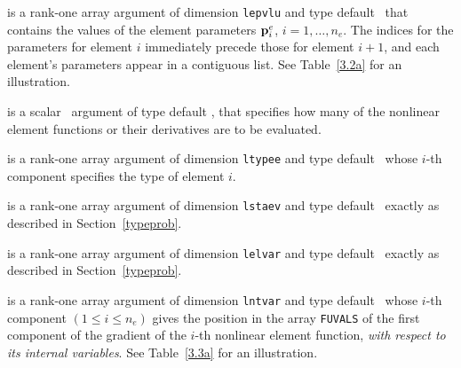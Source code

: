 \documentclass{galahad}
\begin{document}
\begin{description}
 is a rank-one \intentin array argument of
dimension {\tt lepvlu}  and type default \realdp\,
that contains the values of the element parameters ${\mathbf{p}}^e_i$, $i = 1, \ldots,
n_e$. The indices for the parameters for element $i$ immediately precede
those for element $i+1$, and each element's parameters appear in a contiguous
list. See Table~\ref{3.2a} for an illustration.

 is a scalar \intentin\ argument of type default \integer,
that specifies how many of the nonlinear element functions or their
derivatives are to be evaluated.

 is a rank-one \intentin array argument of
dimension {\tt ltypee} and type default \integer\,
whose $i$-th component specifies the type of element $i$.

 is a rank-one \intentin array argument of
dimension {\tt lstaev} and type default \integer\,
exactly as described in Section~\ref{typeprob}.

 is a rank-one \intentin array argument of
dimension {\tt lelvar} and type default \integer\,
exactly as described in Section~\ref{typeprob}.

 is a rank-one \intentin array argument of
dimension {\tt lntvar} and type default \integer\,
whose $i$-th component $(1 \leq i \leq n_e )$
gives the position in the array {\tt FUVALS} of the first component of
the gradient of the $i$-th nonlinear element function, {\em with respect
to its internal variables}.
See Table~\ref{3.3a} for an illustration.


\end{description}
\end{document}
